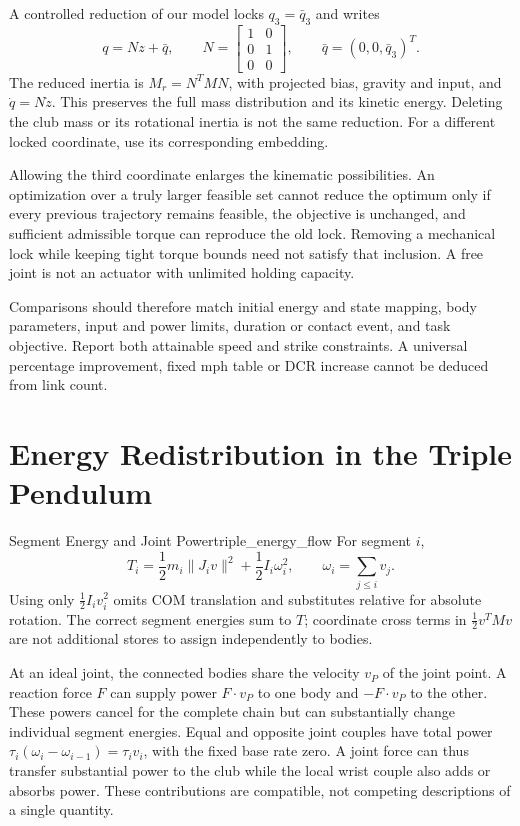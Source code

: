 A controlled reduction of our model locks $q_3=\bar q_3$ and writes
\[
q=N z+\bar q,\qquad
N=\begin{bmatrix}1&0\\0&1\\0&0\end{bmatrix},\qquad
\bar q=(0,0,\bar q_3)^T.
\]
The reduced inertia is $M_r=N^T M N$, with projected bias, gravity and input, and $\dot q=N\dot z$. This preserves the full mass distribution and its kinetic energy. Deleting the club mass or its rotational inertia is not the same reduction. For a different locked coordinate, use its corresponding embedding.

Allowing the third coordinate enlarges the kinematic possibilities. An optimization over a truly larger feasible set cannot reduce the optimum only if every previous trajectory remains feasible, the objective is unchanged, and sufficient admissible torque can reproduce the old lock. Removing a mechanical lock while keeping tight torque bounds need not satisfy that inclusion. A free joint is not an actuator with unlimited holding capacity.

Comparisons should therefore match initial energy and state mapping, body parameters, input and power limits, duration or contact event, and task objective. Report both attainable speed and strike constraints. A universal percentage improvement, fixed mph table or DCR increase cannot be deduced from link count.

\section{Energy Redistribution in the Triple Pendulum}
\label{sec:triple_energy_redistribution}
\label{princ:principle:triple_energy_flow}
\begin{definition}{Segment Energy and Joint Power}{triple_energy_flow}
For segment $i$,
\[
T_i=\frac12m_i\lVert J_i v\rVert^2+\frac12 I_i\omega_i^2,
\qquad \omega_i=\sum_{j\le i}v_j.
\]
Using only $\tfrac12 I_i v_i^2$ omits COM translation and substitutes relative for absolute rotation. The correct segment energies sum to $T$; coordinate cross terms in $\tfrac12v^T Mv$ are not additional stores to assign independently to bodies.
\end{definition}

At an ideal joint, the connected bodies share the velocity $v_P$ of the joint point. A reaction force $F$ can supply power $F\cdot v_P$ to one body and $-F\cdot v_P$ to the other. These powers cancel for the complete chain but can substantially change individual segment energies. Equal and opposite joint couples have total power $\tau_i(\omega_i-\omega_{i-1})=\tau_i v_i$, with the fixed base rate zero. A joint force can thus transfer substantial power to the club while the local wrist couple also adds or absorbs power. These contributions are compatible, not competing descriptions of a single quantity.

